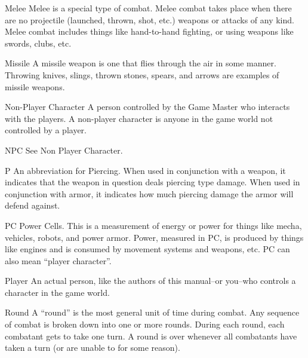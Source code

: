 \documentclass[twoside]{book}
\begin{document}
              
               Melee   
                  Melee is a special type of combat. Melee combat
                 takes place when there are no projectile (launched,
                 thrown, shot, etc.) weapons or attacks of any kind.
                 Melee combat includes things like hand-to-hand fighting,
                 or using weapons like swords, clubs, etc. 
              
              
               Missile   
                  A missile weapon is one that flies through the
                 air in some manner. Throwing knives, slings, thrown
                 stones, spears, and arrows are examples of missile
                 weapons. 
              
              
               Non-Player Character   
                  A person controlled by the Game Master who
                 interacts with the players. A non-player character is
                 anyone in the game world not controlled by a player.
                 
              
              
               NPC   
                See Non Player Character.   
              
              
               P   
                  An abbreviation for Piercing. When used in
                 conjunction with a weapon, it indicates that the weapon
                 in question deals piercing type damage. When used in
                 conjunction with armor, it indicates how much piercing
                 damage the armor will defend against. 
              
              
               PC   
                  Power Cells. This is a measurement of energy or
                 power for things like mecha, vehicles, robots, and power
                 armor. Power, measured in PC, is produced by things like
                 engines and is consumed by movement systems and weapons,
                 etc. PC can also mean “player character”.
                 
              
              
               Player   
                  An actual person, like the authors of this
                 manual–or you–who controls a character in
                 the game world. 
              
              
               Round   
                  A “round” is the most general unit of
                 time during combat. Any sequence of combat is broken
                 down into one or more rounds. During each round, each
                 combatant gets to take one turn. A round is over
                 whenever all combatants have taken a turn (or are unable
                 to for some reason). 
              
\end{document}
